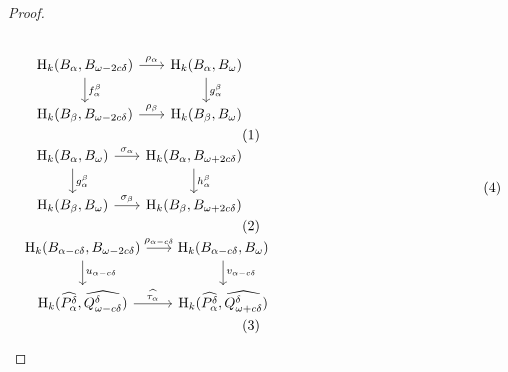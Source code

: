 \begin{proof}
  \begin{scriptsize}
  \vspace{3ex}\begin{subequations}
  \begin{minipage}{0.5\textwidth}\begin{equation}\label{dgm:intr_tight1a}
  \begin{tikzcd}[column sep=scriptsize]
    \hom_k(B_\alpha, \b)\arrow{r}{\rho_\alpha} \arrow{d}{f_\alpha^\beta} &
    \hom_k(B_\alpha, \B)\arrow{d}{g_\alpha^\beta} \\
    \hom_k(B_\beta, \b)\arrow{r}{\rho_\beta} &
    \hom_k(B_\beta, \B)
  \end{tikzcd}\end{equation}
  \begin{equation}\label{dgm:intr_tight1b}
  \begin{tikzcd}[column sep=scriptsize]
    \hom_k(B_\alpha, \B)\arrow{r}{\sigma_\alpha} \arrow{d}{g_\alpha^\beta} &
    \hom_k(B_\alpha, \BB)\arrow{d}{h_\alpha^\beta} \\
    \hom_k(B_\beta, \B)\arrow{r}{\sigma_\beta} &
    \hom_k(B_\beta, \BB)
  \end{tikzcd}\end{equation}%
  \begin{equation}\label{dgm:intr_tight1c}
  \begin{tikzcd}[column sep=scriptsize]
    \hom_k(B_{\alpha-c\of}, \b)\arrow{r}{\rho_{\alpha-c\of}} \arrow{d}{u_{\alpha-c\of}} &
    \hom_k(B_{\alpha-c\of}, \B)\arrow{d}{v_{\alpha-c\of}} \\
    \hom_k(\ext{\P_\alpha}, \ext{\Q^\of})\arrow{r}{\ext{\tau_{\alpha}}} &
    \hom_k(\ext{\P_\alpha}, \ext{\QQ^\of})
  \end{tikzcd}\end{equation}\end{minipage}
  \begin{minipage}{0.5\textwidth}\begin{equation}\label{dgm:intr_tight1d}
  \begin{tikzcd}[column sep=scriptsize]

\end{tikzcd}
\end{equation}
\end{minipage}
\end{subequations}
\end{scriptsize}
\end{proof}
